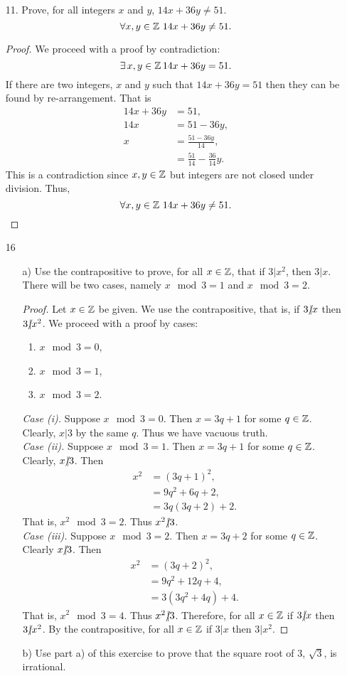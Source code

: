 \documentclass[a4paper, 12pt]{../../config/homework}
\begin{document}
\begin{enumerate}
\vspace{2\singlelineheight}
\item[11.] Prove, for all integers $x$ and $y$, $14x+36y\neq 51.$
\[\forall x,y\in\ints\ 14x+36y\neq51.\]
\begin{proof}
We proceed with a proof by contradiction:
\[\exists\,x,y\in\mathbb{Z}\,14x+36y=51.\]
If there are two integers, $x$ and $y$ such that $14x+36y=51$ then they can be found by re-arrangement. That is
\begin{align*}
14x + 36y &= 51,\\
14x &= 51 - 36y,\\
x &= \frac{51-36y}{14},\\
&= \frac{51}{14} - \frac{36}{14}y.
\end{align*}
This is a contradiction since $x,y\in\mathbb{Z}$ but integers are not closed under division. Thus,
\[\forall x,y\in\ints\ 14x+36y\neq51.\]
\end{proof}

\pagebreak
\item[16]
\begin{enumerate}
\item[a)] Use the contrapositive to prove, for all $x\in\mathbb{Z}$, that if $3|x^2$, then $3|x$. There will be two cases, namely $x\mod3=1$ and $x\mod3=2$.
\begin{proof}
Let \(x\in\mathbb{Z}\) be given. We use the contrapositive, that is, if \(3\ndiv x\) then \(3 \ndiv x^2\). We proceed with a proof by cases:
\begin{enumerate}[label=\textit{(\roman*)}]
\item \(x\mod3=0\),
\item \(x\mod3=1\),
\item \(x\mod3=2\).
\end{enumerate}
\textit{Case (i).} Suppose \(x\mod3=0\). Then \(x=3q+1\) for some \(q\in\mathbb{Z}\). Clearly, \(x|3\) by the same \(q\). Thus we have vacuous truth.
\\\textit{Case (ii).} Suppose \(x\mod3=1\). Then \(x=3q+1\) for some \(q\in\mathbb{Z}\). Clearly, \(x\ndiv 3\). Then
\begin{align*}
x^2 &= (3q+1)^2,\\
&= 9q^2 + 6q + 2,\\
&= 3q(3q+2) + 2.
\end{align*}
That is, $x^2\mod3=2$. Thus \(x^2 \ndiv 3\).
\\\textit{Case (iii).} Suppose \(x\mod3=2\). Then \(x=3q+2\) for some \(q\in\mathbb{Z}\). Clearly \(x\ndiv3\). Then
\begin{align*}
x^2 &= (3q+2)^2,\\
&= 9q^2 + 12q + 4,\\
&= 3(3q^2 + 4q) + 4.
\end{align*}
That is, \(x^2 \mod 3 = 4\). Thus \(x^2 \ndiv 3\).
Therefore, for all \(x\in\mathbb{Z}\) if \(3\ndiv x\) then \(3 \ndiv x^2\). By the contrapositive, for all \(x\in\mathbb{Z}\) if \(3|x\) then \(3|x^2\).
\end{proof}
\item[b)] Use part a) of this exercise to prove that the square root of $3$, $\sqrt{3}$, is irrational.
\end{enumerate}
\end{enumerate}
\end{document}

